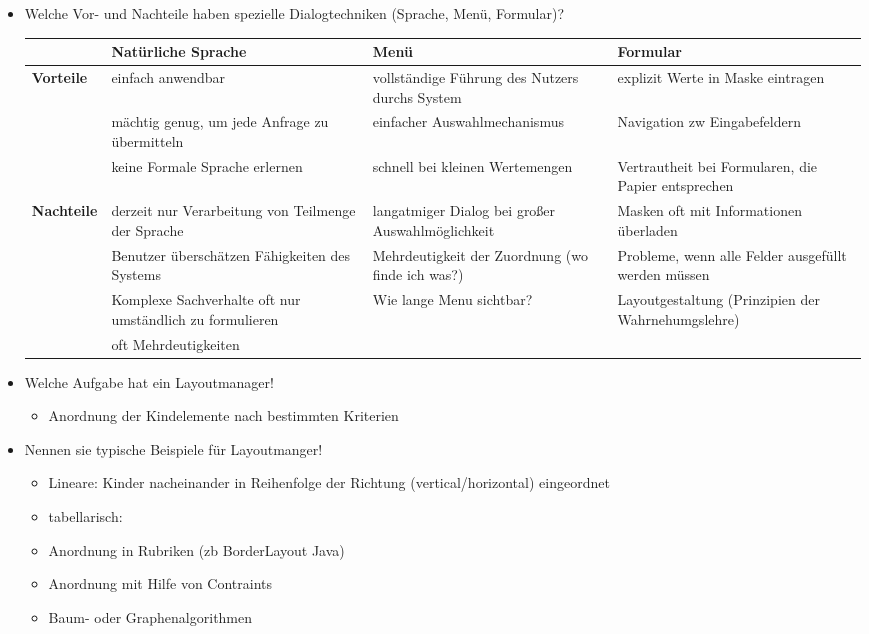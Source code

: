 \begin{itemize}
	\item Welche Vor- und Nachteile haben spezielle Dialogtechniken (Sprache, Menü, Formular)?
	\begin{table}[!h]
		\centering
		\begin{tabular}{|l|p{11em}|p{11em}|p{11em}|}
			\hline
			&\textbf{Natürliche Sprache} & \textbf{Menü} & \textbf{Formular}\\
			\hline
			\hline
			\textbf{Vorteile} & einfach anwendbar & vollständige Führung des Nutzers durchs System & explizit Werte in Maske eintragen\\
			& mächtig genug, um jede Anfrage zu übermitteln & einfacher Auswahlmechanismus & Navigation zw Eingabefeldern\\
			& keine Formale Sprache erlernen &schnell bei kleinen Wertemengen& Vertrautheit bei Formularen, die Papier entsprechen\\
			\hline
			\textbf{Nachteile} & derzeit nur Verarbeitung von Teilmenge der Sprache & langatmiger Dialog bei großer Auswahlmöglichkeit& Masken oft mit Informationen überladen\\
			& Benutzer überschätzen Fähigkeiten des Systems &Mehrdeutigkeit der Zuordnung (wo finde ich was?)& Probleme, wenn alle Felder ausgefüllt werden müssen\\
			& Komplexe Sachverhalte oft nur umständlich zu formulieren &Wie lange Menu sichtbar?& Layoutgestaltung (Prinzipien der Wahrnehumgslehre)\\
			& oft Mehrdeutigkeiten && \\
			\hline
		\end{tabular}
	\end{table}
	\item Welche Aufgabe hat ein Layoutmanager!
	\begin{itemize}
		\item Anordnung der Kindelemente nach bestimmten Kriterien
	\end{itemize}
	\item Nennen sie typische Beispiele für Layoutmanger!
	\begin{itemize}
		\item Lineare: Kinder nacheinander in Reihenfolge der Richtung (vertical/horizontal) eingeordnet
		\item tabellarisch: 
		\item Anordnung in Rubriken (zb BorderLayout Java)
		\item Anordnung mit Hilfe von Contraints
		\item Baum- oder Graphenalgorithmen
	\end{itemize}
	

\end{itemize}
